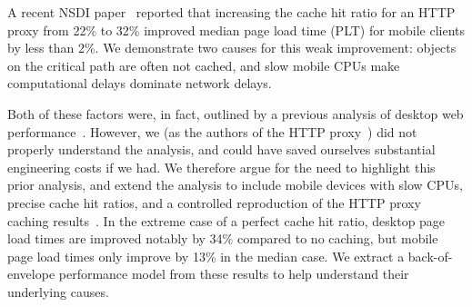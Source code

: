 A recent NSDI paper~\cite{flywheel} reported that
increasing the cache hit ratio for an HTTP proxy from 22\% to 32\% improved
median page load time (PLT) for mobile clients by less than 2\%.
We demonstrate two causes for this weak improvement:
objects on the critical path are often not cached, and
slow mobile CPUs make computational delays dominate network delays. %

Both of
these factors were, in fact, outlined by a previous analysis of desktop
web performance~\cite{wang2013demystifying}. However, we (as the authors of the HTTP proxy~\cite{flywheel}) did not properly understand the analysis, and could have saved ourselves substantial engineering costs if we had. We therefore argue for the need to highlight this prior
analysis, and extend the analysis
to include mobile devices with slow CPUs, precise cache hit ratios,
and a controlled reproduction of the
HTTP proxy caching
results~\cite{flywheel}. %
In the extreme case of a perfect cache hit ratio, desktop page load times are
improved notably by 34\% compared to no caching, but mobile page
load times only improve by 13\% in the median case.
We extract a back-of-envelope performance model from these results to
help understand their underlying causes.




